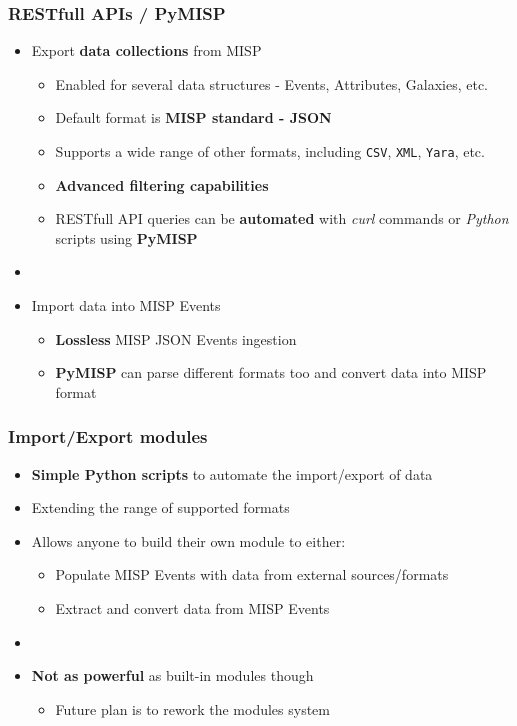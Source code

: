 \begin{frame}
    \frametitle{RESTfull APIs / PyMISP}
    \begin{itemize}
        \item Export \textbf{data collections} from MISP
        \begin{itemize}
            \item Enabled for several data structures - Events, Attributes, Galaxies, etc.
            \item Default format is \textbf{MISP standard - JSON}
            \item Supports a wide range of other formats, including \texttt{CSV}, \texttt{XML}, \texttt{Yara}, etc.
            \item \textbf{Advanced filtering capabilities}
            \item RESTfull API queries can be \textbf{automated} with \textit{curl} commands or \textit{Python} scripts using \textbf{PyMISP}
        \end{itemize}
        \item []
        \item Import data into MISP Events
        \begin{itemize}
            \item \textbf{Lossless} MISP JSON Events ingestion
            \item \textbf{PyMISP} can parse different formats too and convert data into MISP format
        \end{itemize}
    \end{itemize}
\end{frame}

\begin{frame}
    \frametitle{Import/Export modules}
    \begin{itemize}
        \item \textbf{Simple Python scripts} to automate the import/export of data
        \item Extending the range of supported formats
        \item Allows anyone to build their own module to either:
        \begin{itemize}
            \item Populate MISP Events with data from external sources/formats
            \item Extract and convert data from MISP Events
        \end{itemize}
        \item []
        \item \textbf{Not as powerful} as built-in modules though
        \begin{itemize}
            \item Future plan is to rework the modules system
        \end{itemize}
    \end{itemize}
\end{frame}


